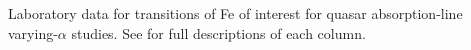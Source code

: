 Laboratory data for transitions of Fe of interest for quasar absorption-line varying-$\alpha$ studies. See  for full descriptions of each column.
